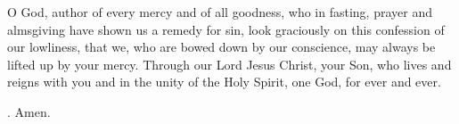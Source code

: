 \lettrine[lines=3]{O}{} God, author of every mercy and of all goodness,
who in fasting, prayer and almsgiving
have shown us a remedy for sin,
look graciously on this confession of our lowliness,
that we, who are bowed down by our conscience,
may always be lifted up by your mercy.
Through our Lord Jesus Christ, your Son,
who lives and reigns with you and in the unity of the Holy Spirit,
one God, for ever and ever.
\par \Rbar. Amen.

